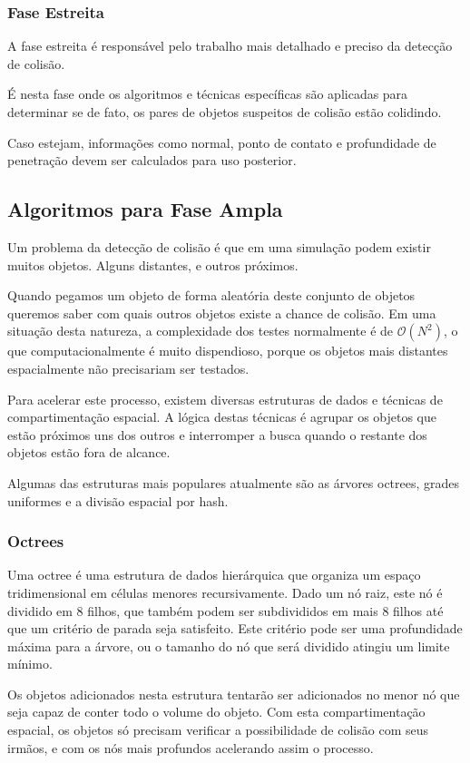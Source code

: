 \subsubsection{Fase Estreita}
A fase estreita é responsável pelo trabalho mais detalhado e preciso da
detecção de colisão.

É nesta fase onde os algoritmos e técnicas específicas são
aplicadas para determinar se de fato, os pares de objetos suspeitos de colisão
estão colidindo.

Caso estejam, informações como normal, ponto de contato e profundidade de
penetração devem ser calculados para uso posterior.

\subsection{Algoritmos para Fase Ampla}
Um problema da detecção de colisão é que em uma simulação podem existir muitos
objetos. Alguns distantes, e outros próximos.

Quando pegamos um objeto de forma aleatória deste conjunto de objetos queremos saber com quais outros objetos
existe a chance de colisão.
Em uma situação desta natureza, a complexidade dos testes normalmente é de $\mathcal{O}(N^2)$, o que
computacionalmente é muito dispendioso, porque os objetos mais distantes
espacialmente não precisariam ser testados.

Para acelerar este processo, existem diversas estruturas de dados e técnicas de compartimentação espacial.
A lógica destas técnicas é agrupar os objetos que estão próximos uns dos outros
e interromper a busca quando o restante dos objetos estão fora de alcance.

Algumas das estruturas mais populares atualmente são as árvores octrees, grades
uniformes e a divisão espacial por hash.

\subsubsection{Octrees}

Uma octree é uma estrutura de dados hierárquica que organiza um espaço
tridimensional em células menores recursivamente.
Dado um nó raiz, este nó é dividido em 8  filhos, que também podem ser
subdivididos em mais 8 filhos até que um critério de parada seja satisfeito.
Este critério pode ser uma profundidade máxima para a árvore, ou o tamanho do
nó que será dividido atingiu um limite mínimo.

Os objetos adicionados nesta estrutura tentarão ser adicionados no menor nó que
seja capaz de conter todo o volume do objeto. Com esta compartimentação
espacial, os objetos só precisam verificar a possibilidade de colisão com seus
irmãos, e com os nós mais profundos acelerando assim o processo.

